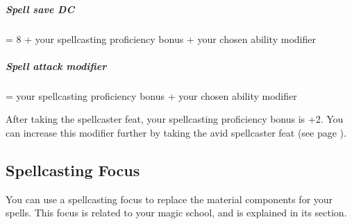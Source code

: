     \subparagraph{Spell save DC} = 8 + your spellcasting proficiency bonus + your chosen ability modifier
    \subparagraph{Spell attack modifier} = your spellcasting proficiency bonus + your chosen ability modifier

    After taking the spellcaster feat, your spellcasting proficiency bonus is +2.
    You can increase this modifier further by taking the avid spellcaster feat (see page \pageref{feat::avidspellcaster}).

\subsection*{Spellcasting Focus}
    You can use a spellcasting focus to replace the material components for your spells.
    This focus is related to your magic school, and is explained in its section.

\newpage %
